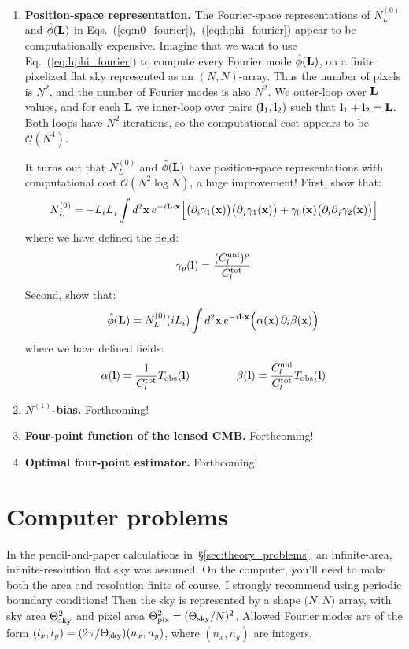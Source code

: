 \documentclass[aps,prd,superscriptaddress,groupedaddress,nofootinbib,nobibnotes]{revtex4}
\newcommand{\be}{\begin{equation}}
\newcommand{\ee}{\end{equation}}
\newcommand{\bigoh}{\mathcal{O}}
\def\x{{\bf x}}
\def\l{{\bf l}}
\def\L{{\bf L}}
\def\hphi{{\hat\phi}}
\begin{document}
\begin{enumerate}
\item {\bf Position-space representation.}
The Fourier-space representations of $N_L^{(0)}$ and $\hphi(\L)$ in Eqs.~(\ref{eq:n0_fourier}),~(\ref{eq:hphi_fourier})
appear to be computationally expensive.  Imagine that we want to use Eq.~(\ref{eq:hphi_fourier}) to compute every Fourier
mode $\hphi(\L)$, on a finite pixelized flat sky represented as an $(N,N)$-array.  Thus the number of pixels
is $N^2$, and the number of Fourier modes is also $N^2$.  We outer-loop over $\L$ values, and for each $\L$
we inner-loop over pairs $(\l_1,\l_2)$ such that $\l_1+\l_2=\L$.  Both loops have $N^2$ iterations, so the
computational cost appears to be $\bigoh(N^4)$.

It turns out that $N_L^{(0)}$ and $\hphi(\L)$ have position-space representations with computational cost
$\bigoh(N^2 \log N)$, a huge improvement!  First, show that:
\be
N_L^{(0)} = -L_i L_j \int d^2\x \, e^{-i\L\cdot\x} \Big[
  \big( \partial_i \gamma_1(\x) \big) \big( \partial_j \gamma_1(\x) \big) +
  \gamma_0(\x) \big( \partial_i \partial_j \gamma_2(\x) \big) \Big]
\ee
where we have defined the field:
\be
\gamma_p(\l) = \frac{(C_l^{\rm unl})^p}{C_l^{\rm tot}}
\ee
Second, show that:
\be
\hphi(\L) =  N_L^{(0)} (iL_i) \int d^2\x \, e^{-i\l\cdot\x} \Big( \alpha(\x) \, \partial_i \beta(\x) \Big)
\ee
where we have defined fields:
\be
\alpha(\l) = \frac{1}{C_l^{\rm tot}} T_{\rm obs}(\l)
\hspace{1.5cm}
\beta(\l) = \frac{C_l^{\rm unl}}{C_l^{\rm tot}} T_{\rm obs}(\l)
\ee

\item {\bf $N^{(1)}$-bias.}  Forthcoming!
  
\item {\bf Four-point function of the lensed CMB.}  Forthcoming!

\item {\bf Optimal four-point estimator.}  Forthcoming!

\setcounter{enumi_save}{\value{enumi}}
\end{enumerate}

\section{Computer problems}
\label{sec:computer_problems}

In the pencil-and-paper calculations in~\S\ref{sec:theory_problems}, an infinite-area, infinite-resolution flat sky was assumed.
On the computer, you'll need to make both the area and resolution finite of course.
I strongly recommend using periodic boundary conditions!
Then the sky is represented by a shape $(N,N$) array, with sky area $\Theta_{\rm sky}^2$ and pixel area $\Theta_{\rm pix}^2 = (\Theta_{\rm sky}/N)^2$.
Allowed Fourier modes are of the form $(l_x, l_y) = (2\pi/\Theta_{\rm sky}) (n_x, n_y)$, where $(n_x,n_y)$ are integers.
\end{document}
